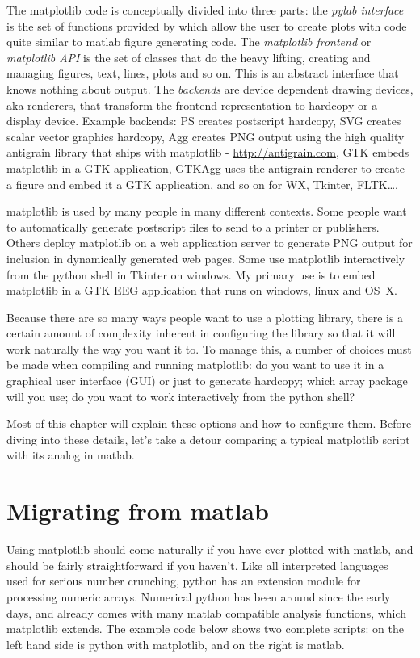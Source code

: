 \documentclass[twoside]{book}
\begin{document}
The matplotlib code is conceptually divided into three parts: the
\textit{pylab interface} is the set of functions provided by
 which allow the user to create plots with code quite
similar to matlab figure generating code.  The \textit{matplotlib
  frontend} or \textit{matplotlib API} is the set of classes that do
the heavy lifting, creating and managing figures, text, lines, plots
and so on.  This is an abstract interface that knows nothing about
output.  The \textit{backends} are device dependent drawing devices,
aka renderers, that transform the frontend representation to hardcopy
or a display device.  Example backends: PS creates postscript
hardcopy, SVG creates scalar vector graphics hardcopy, Agg creates PNG
output using the high quality antigrain library that ships with
matplotlib - \url{http://antigrain.com}, GTK embeds matplotlib in a
GTK application, GTKAgg uses the antigrain renderer to create a figure
and embed it a GTK application, and so on for WX, Tkinter, FLTK\dots.

matplotlib is used by many people in many different contexts.  Some
people want to automatically generate postscript files to send to a
printer or publishers.  Others deploy matplotlib on a web application
server to generate PNG output for inclusion in dynamically generated
web pages.  Some use matplotlib interactively from the python shell in
Tkinter on windows.  My primary use is to embed matplotlib in a GTK
EEG application that runs on windows, linux and OS~X.

Because there are so many ways people want to use a plotting library,
there is a certain amount of complexity inherent in configuring the
library so that it will work naturally the way you want it to.  To
manage this, a number of choices must be made when compiling and
running matplotlib: do you want to use it in a graphical user
interface (GUI) or just to generate hardcopy; which array package will
you use; do you want to work interactively from the python shell?  

Most of this chapter will explain these options and how to configure
them.  Before diving into these details, let's take a detour comparing
a typical matplotlib script with its analog in matlab.

\section{Migrating from matlab}
\label{sec:migrating}

Using matplotlib should come naturally if you have ever plotted with
matlab, and should be fairly straightforward if you haven't.  Like all
interpreted languages used for serious number crunching, python has an
extension module for processing numeric arrays.  Numerical python has
been around since the early days, and already comes with many matlab
compatible analysis functions, which matplotlib extends.  The example
code below shows two complete scripts: on the left hand side is python
with matplotlib, and on the right is matlab.  
\end{document}
